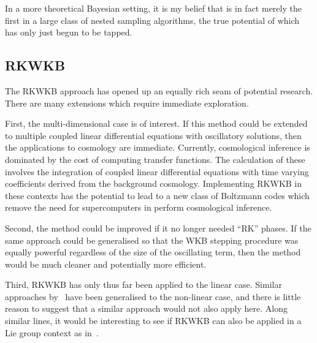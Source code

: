 In a more theoretical Bayesian setting, it is my belief that \PolyChord{} is in fact merely the first in a large class of nested sampling algorithms, the true potential of which has only just begun to be tapped.

\subsection*{RKWKB}
The RKWKB approach has opened up an equally rich seam of potential research. There are many extensions which require immediate exploration. 

First, the multi-dimensional case is of interest. If this method could be extended to multiple coupled linear differential equations with oscillatory solutions, then the applications to cosmology are immediate. Currently, cosmological inference is dominated by the cost of computing transfer functions. The calculation of these involves the integration of coupled linear differential equations with time varying coefficients derived from the background cosmology. Implementing RKWKB in these contexts has the potential to lead to a new class of Boltzmann codes which remove the need for supercomputers in perform cosmological inference.

Second, the method could be improved if it no longer needed ``RK'' phases. If the same approach could be generalised so that the WKB stepping procedure was equally powerful regardless of the size of the oscillating term, then the method would be much cleaner and potentially more efficient.

Third, RKWKB has only thus far been applied to the linear case. Similar approaches by~\cite{Iserles03onthe} have been generalised to the non-linear case, and there is little reason to suggest that a similar approach would not also apply here. Along similar lines, it would be interesting to see if RKWKB can also be applied in a Lie group context as in~\cite{Iserles00lie-groupmethods}.




